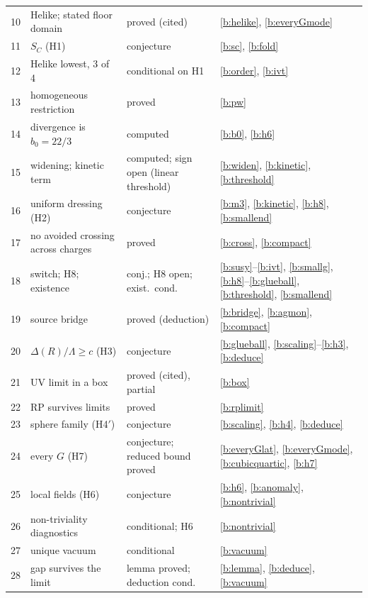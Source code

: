 \begin{longtable}{@{}r>{\raggedright}p{2.12in}>{\raggedright}p{1.42in}>{\raggedright\arraybackslash}p{2.12in}@{}}
10 & Helike; stated floor domain & proved (cited) & \ref{b:helike}, \ref{b:everyGmode}\\
11 & $S_C$ (H1) & conjecture & \ref{b:sc}, \ref{b:fold}\\
12 & Helike lowest, 3 of 4 & conditional on H1 & \ref{b:order}, \ref{b:ivt}\\
13 & homogeneous restriction & proved & \ref{b:pw}\\
14 & divergence is $b_0=22/3$ & computed & \ref{b:b0}, \ref{b:h6}\\
15 & widening; kinetic term & computed; sign open (linear threshold) & \ref{b:widen}, \ref{b:kinetic}, \ref{b:threshold}\\
16 & uniform dressing (H2) & conjecture & \ref{b:m3}, \ref{b:kinetic}, \ref{b:h8}, \ref{b:smallend}\\
17 & no avoided crossing across charges & proved & \ref{b:cross}, \ref{b:compact}\\
18 & switch; H8; existence & conj.; H8 open; exist.\ cond. &
  \ref{b:susy}--\ref{b:ivt}, \ref{b:smallg}, \ref{b:h8}--\ref{b:glueball}, \ref{b:threshold}, \ref{b:smallend}\\
19 & source bridge & proved (deduction) & \ref{b:bridge}, \ref{b:agmon}, \ref{b:compact}\\
20 & $\Delta(R)/\Lambda\ge c$ (H3) & conjecture & \ref{b:glueball}, \ref{b:scaling}--\ref{b:h3}, \ref{b:deduce}\\
21 & UV limit in a box & proved (cited), partial & \ref{b:box}\\
22 & RP survives limits & proved & \ref{b:rplimit}\\
23 & sphere family (H4$'$) & conjecture & \ref{b:scaling}, \ref{b:h4}, \ref{b:deduce}\\
24 & every $G$ (H7) & conjecture; reduced bound proved & \ref{b:everyGlat}, \ref{b:everyGmode}, \ref{b:cubicquartic}, \ref{b:h7}\\
25 & local fields (H6) & conjecture & \ref{b:h6}, \ref{b:anomaly}, \ref{b:nontrivial}\\
26 & non-triviality diagnostics & conditional; H6 & \ref{b:nontrivial}\\
27 & unique vacuum & conditional & \ref{b:vacuum}\\
28 & gap survives the limit & lemma proved; deduction cond. & \ref{b:lemma}, \ref{b:deduce}, \ref{b:vacuum}\\
\end{longtable}

